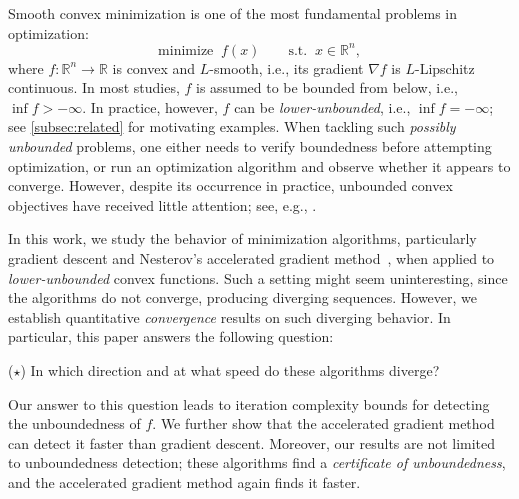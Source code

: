 \documentclass[11pt,a4paper]{article}
\theoremstyle{definition}
\theoremstyle{plain}
\newcommand{\RR}{{\mathbb{R}}}
\begin{document}
Smooth convex minimization is one of the most fundamental problems in optimization:
\begin{equation}\label{intro:primal}
    \text{minimize }\ f(x) \qquad \text{s.t. }\ x \in \RR^n,
\end{equation}
where $f: \RR^n \to \RR$ is convex and $L$-smooth, i.e., its gradient $\nabla f$ is $L$-Lipschitz continuous.
In most studies, $f$ is assumed to be bounded from below, i.e., $\inf f > -\infty$.
In practice, however, $f$ can be \textit{lower-unbounded}, i.e., $\inf f = -\infty$; see \cref{subsec:related} for motivating examples.
When tackling such \textit{possibly unbounded} problems, one either needs to verify boundedness before attempting optimization, or run an optimization algorithm and observe whether it appears to converge.
However, despite its occurrence in practice, unbounded convex objectives have received little attention; see, e.g., \cite{Auslender1997,HS2024,Obuchowska2004}.

In this work, we study the behavior of minimization algorithms, particularly gradient descent and Nesterov's accelerated gradient method~\cite{Nesterov1983}, when applied to \textit{lower-unbounded} convex functions.
Such a setting might seem uninteresting, since the algorithms do not converge, producing diverging sequences.
However, we establish quantitative \textit{convergence} results on such diverging behavior.
In particular, this paper answers the following question:
\begin{center}
    ($\star$) \quad In which direction and at what speed do these algorithms diverge?
\end{center}
Our answer to this question leads to iteration complexity bounds for detecting the unboundedness of $f$.
We further show that the accelerated gradient method can detect it faster than gradient descent.
Moreover, our results are not limited to unboundedness detection; these algorithms find a \textit{certificate of unboundedness}, and the accelerated gradient method again finds it faster.
\end{document}
